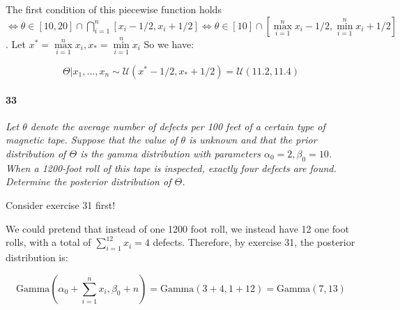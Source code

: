 \documentclass[a4paper]{article}
\begin{document}
                The first condition of this piecewise function holds $\iff
                \theta \in [10, 20] \cap \bigcap\limits_{i=1}^n [x_i - 1/2, x_i
                + 1/2] \iff \theta \in [10] \cap [\max\limits_{i=1}^n x_i - 1/2,
                \min\limits_{i=1}^n x_i + 1/2]$. Let $x^* = \max\limits_{i=1}^n
                x_i, x_* = \min\limits_{i = 1}^n x_i$ So we have:

                \[
                    \Theta | x_1, ..., x_n \sim \mathcal{U}(x^* - 1/2, x_* +
                    1/2) = \mathcal{U}(11.2, 11.4)
                \]

            \paragraph{33}
            \textit{Let $\theta$ denote the average number of defects per 100
            feet of a certain type of magnetic tape. Suppose that the value of
            $\theta$ is unknown and that the prior distribution of $\Theta$ is
            the gamma distribution with parameters $\alpha_0 = 2, \beta_0 = 10$.
            When a 1200-foot roll of this tape is inspected, exactly four
            defects are found. Determine the posterior distribution of
            $\Theta$.}
                \begin{relq}
                    Consider exercise 31 first!
                \end{relq}

                We could pretend that instead of one 1200 foot roll, we instead
                have 12 one foot rolls, with a total of $\sum\limits_{i=1}^{12}
                x_i = 4$ defects. Therefore, by exercise 31, the posterior
                distribution is:

                \[
                    \text{Gamma}\left(\alpha_0 + \sum\limits_{i=1}^{n} x_i,
                    \beta_0 + n\right) = \text{Gamma}(3 + 4, 1 + 12) =
                    \text{Gamma}(7, 13)
                \]
\end{document}
